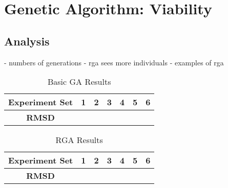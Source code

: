\section{Genetic Algorithm: Viability}

\subsection{Analysis}

- numbers of generations
- rga sees more individuals
- examples of rga

\begin{table}
	\label{table:basic-ga-results}
	\centering
	\begin{tabular}{ | >{\bfseries}c | c | c | c | c | c | c | }
		\hline
		Experiment Set & 1 & 2 & 3 & 4 & 5 & 6 \\ \hline
		RMSD &  &  &  &  &  &  \\ \hline
	\end{tabular}
	\caption{Basic GA Results}
\end{table}

\begin{table}
	\label{table:rga-results}
	\centering
	\begin{tabular}{ | >{\bfseries}c | c | c | c | c | c | c | }
		\hline
		Experiment Set & 1 & 2 & 3 & 4 & 5 & 6 \\ \hline
		RMSD &  &  &  &  &  &  \\ \hline
	\end{tabular}
	\caption{RGA Results}
\end{table}